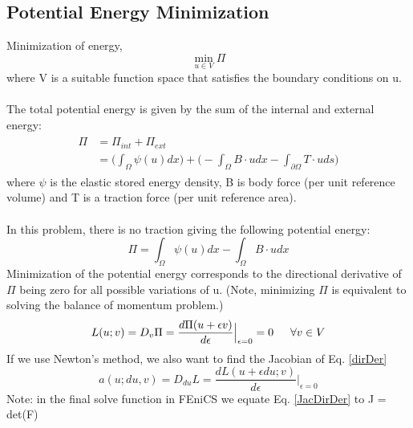 \documentclass[12pt,3p]{article}
\begin{document}
\subsection{Potential Energy Minimization}
Minimization of energy,
\[ \min_{u \in V} \Pi \]
where V is a suitable function space that satisfies the boundary conditions on u.\\ \\
The total potential energy is given by the sum of the internal and external energy: 
\begin{align}\label{totPotEnergy}
\begin{split}
\Pi &= \Pi_{int} + \Pi_{ext} \\
	&= \bigg( \int_{\Omega} \psi(u) dx \bigg) + \bigg( - \int_{\Omega} B \cdot u dx - \int_{\partial \Omega} T \cdot u ds \bigg) 
\end{split}
\end{align}
where $\psi$ is the elastic stored energy density, B is body force (per unit reference volume) and T is a traction force (per unit reference area). \\ \\
In this problem, there is no traction giving the following potential energy: \\ 
\begin{equation}\label{PotEnergy}
\Pi = \int_{\Omega} \psi(u) dx - \int_{\Omega} B \cdot u dx
\end{equation}
Minimization of the potential energy corresponds to the directional derivative of $\Pi$ being zero for all possible variations of u. (Note, minimizing $\Pi$ is equivalent to solving the balance of momentum problem.) 
\begin{equation} \label{dirDer}
L(u;v) = D_v \Pi = \frac{d \Pi (u + \epsilon v)}{d \epsilon} \Bigr\rvert_{\epsilon = 0} = 0 \indent \forall v \in V
\end{equation}
If we use Newton's method, we also want to find the Jacobian of Eq. \ref{dirDer}
\begin{equation} \label{JacDirDer}
a(u;du,v) = D_{du} L = \frac{dL(u+ \epsilon du; v)}{d \epsilon} \Bigr\rvert_{\epsilon = 0}
\end{equation}
Note: in the final {\selectfont solve} function in FEniCS we equate Eq. \ref{JacDirDer} to J = det(F)
\end{document}
